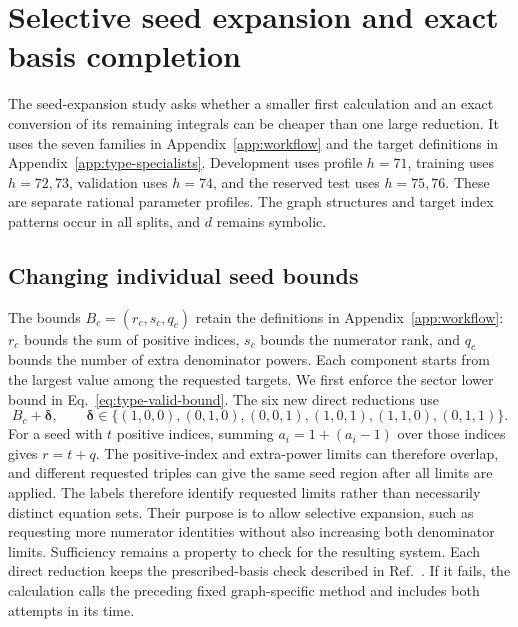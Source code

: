\section{Selective seed expansion and exact basis completion}
\label{app:basis-completion}
The seed-expansion study asks whether a smaller first calculation and an exact conversion of its remaining integrals can be cheaper than one large reduction. It uses the seven families in Appendix~\ref{app:workflow} and the target definitions in Appendix~\ref{app:type-specialists}. Development
uses profile $h=71$, training uses $h=72,73$, validation uses $h=74$, and
the reserved test uses $h=75,76$. These are separate rational parameter
profiles. The graph structures and target index patterns occur in all
splits, and $d$ remains symbolic.

\subsection{Changing individual seed bounds}
The bounds $B_c=(r_c,s_c,q_c)$ retain the definitions in
Appendix~\ref{app:workflow}: $r_c$ bounds the sum of positive indices,
$s_c$ bounds the numerator rank, and $q_c$ bounds the number of extra
denominator powers. Each component starts from the largest value among
the requested targets. We first enforce the sector lower bound in
Eq.~\eqref{eq:type-valid-bound}. The six new direct reductions use
\begin{equation}
 B_c+\boldsymbol\delta,\qquad
 \boldsymbol\delta\in\{(1,0,0),(0,1,0),(0,0,1),
                         (1,0,1),(1,1,0),(0,1,1)\}.
 \label{eq:basis-deltas}
\end{equation}
For a seed with $t$ positive indices, summing $a_i=1+(a_i-1)$ over those
indices gives $r=t+q$. The positive-index and extra-power limits can
therefore overlap, and different requested triples can give the same
seed region after all limits are applied. The labels therefore identify requested limits rather than necessarily distinct equation sets. Their purpose is to allow selective expansion, such as requesting more numerator identities without also increasing both denominator limits. Sufficiency remains a property to check for the resulting system. Each direct
reduction keeps the prescribed-basis check described in Ref.~\cite{Kira3}.
If it fails, the calculation calls the preceding fixed graph-specific
method and includes both attempts in its time.


